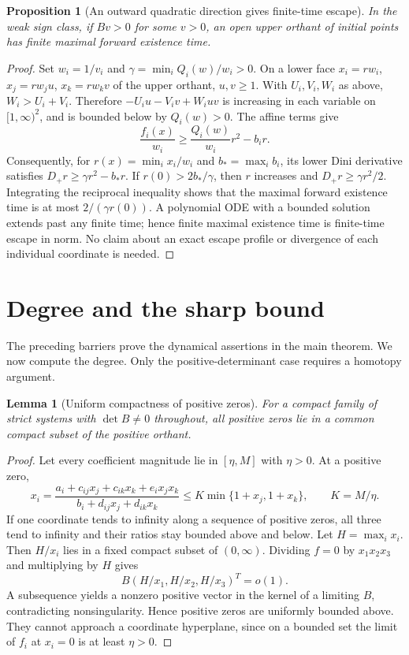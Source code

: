 \documentclass[11pt]{article}
\newtheorem{lemma}[theorem]{Lemma}
\newtheorem{proposition}[theorem]{Proposition}
\theoremstyle{remark}\newtheorem{remark}[theorem]{Remark}
\begin{document}
\begin{proposition}[An outward quadratic direction gives finite-time escape]\label{prop:outward}
In the weak sign class, if $Bv>0$ for some $v>0$, an open upper orthant of
initial points has finite maximal forward existence time.
\end{proposition}
\begin{proof}
Set $w_i=1/v_i$ and $\gamma=\min_i Q_i(w)/w_i>0$.
On a lower face $x_i=rw_i$, $x_j=rw_ju$, $x_k=rw_kv$ of the upper orthant,
$u,v\ge1$. With $U_i,V_i,W_i$ as above, $W_i>U_i+V_i$. Therefore
$-U_i u-V_i v+W_iuv$ is increasing in each variable on $[1,\infty)^2$,
and is bounded below by $Q_i(w)>0$. The affine terms give
\[
 \frac{f_i(x)}{w_i}\ge \frac{Q_i(w)}{w_i}r^2-b_ir.
\]
Consequently, for $r(x)=\min_i x_i/w_i$ and $b_* =\max_i b_i$,
its lower Dini derivative satisfies
$D_+r\ge\gamma r^2-b_*r$.
If $r(0)>2b_*/\gamma$, then $r$ increases and
$D_+r\ge\gamma r^2/2$. Integrating the reciprocal inequality shows that the
maximal forward existence time is at most $2/(\gamma r(0))$. A polynomial ODE
with a bounded solution extends past any finite time; hence finite maximal
existence time is finite-time escape in norm. No claim about an exact escape
profile or divergence of each individual coordinate is needed.
\end{proof}

\section{Degree and the sharp bound}\label{sec:degree}
The preceding barriers prove the dynamical assertions in the main theorem.
We now compute the degree. Only the positive-determinant case requires a
homotopy argument.

\begin{lemma}[Uniform compactness of positive zeros]\label{lem:compact}
For a compact family of strict systems with $\det B\ne0$ throughout, all
positive zeros lie in a common compact subset of the positive orthant.
\end{lemma}
\begin{proof}
Let every coefficient magnitude lie in $[\eta,M]$ with $\eta>0$.
At a positive zero,
\[
 x_i=\frac{a_i+c_{ij}x_j+c_{ik}x_k+e_ix_jx_k}
            {b_i+d_{ij}x_j+d_{ik}x_k}
 \le K\min\{1+x_j,1+x_k\},\qquad K=M/\eta.
\]
If one coordinate tends to infinity along a sequence of positive zeros, all
three tend to infinity and their ratios stay bounded above and below. Let
$H=\max_i x_i$. Then $H/x_i$ lies in a fixed compact subset of $(0,\infty)$.
Dividing $f=0$ by $x_1x_2x_3$ and multiplying by $H$ gives
\[
 B(H/x_1,H/x_2,H/x_3)^T=o(1).
\]
A subsequence yields a nonzero positive vector in the kernel of a limiting $B$,
contradicting nonsingularity. Hence positive zeros are uniformly bounded above.
They cannot approach a coordinate hyperplane, since on a bounded set the limit
of $f_i$ at $x_i=0$ is at least $\eta>0$.
\end{proof}
\end{document}
